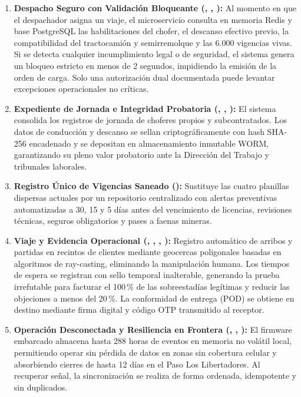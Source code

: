 \begin{enumerate}
  \item \textbf{Despacho Seguro con Validación Bloqueante (, , ):} Al momento
  en que el despachador asigna un viaje, el microservicio consulta en memoria Redis y base PostgreSQL las habilitaciones
  del chofer, el descanso efectivo previo, la compatibilidad del tractocamión y semirremolque y las 6.000 vigencias vivas.
  Si se detecta cualquier incumplimiento legal o de seguridad, el sistema genera un bloqueo estricto en menos de 2
  segundos, impidiendo la emisión de la orden de carga. Solo una autorización dual documentada puede levantar excepciones
  operacionales no críticas.
  \item \textbf{Expediente de Jornada e Integridad Probatoria (, , ):} El sistema
  consolida los registros de jornada de choferes propios y subcontratados. Los datos de conducción y descanso se sellan
  criptográficamente con hash SHA-256 encadenado y se depositan en almacenamiento inmutable WORM, garantizando su
  pleno valor probatorio ante la Dirección del Trabajo y tribunales laborales.
  \item \textbf{Registro Único de Vigencias Saneado ():} Sustituye las cuatro planillas dispersas actuales
  por un repositorio centralizado con alertas preventivas automatizadas a 30, 15 y 5 días antes del vencimiento de licencias,
  revisiones técnicas, seguros obligatorios y pases a faenas mineras.
  \item \textbf{Viaje y Evidencia Operacional (, , , ):} Registro automático
  de arribos y partidas en recintos de clientes mediante geocercas poligonales basadas en algoritmos de ray-casting,
  eliminando la manipulación humana. Los tiempos de espera se registran con sello temporal inalterable, generando la prueba
  irrefutable para facturar el 100\,\% de las sobreestadías legítimas y reducir las objeciones a menos del 20\,\%. La
  conformidad de entrega (POD) se obtiene en destino mediante firma digital y código OTP transmitido al receptor.
  \item \textbf{Operación Desconectada y Resiliencia en Frontera (, , ):} El firmware
  embarcado almacena hasta 288 horas de eventos en memoria no volátil local, permitiendo operar sin pérdida de datos en zonas
  sin cobertura celular y absorbiendo cierres de hasta 12 días en el Paso Los Libertadores. Al recuperar señal, la
  sincronización se realiza de forma ordenada, idempotente y sin duplicados.

\end{enumerate}
